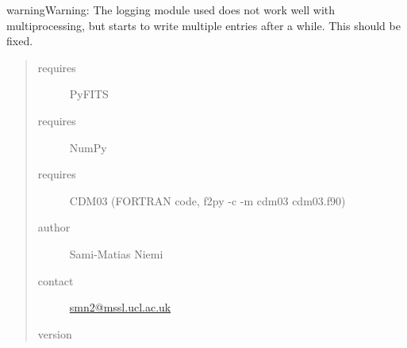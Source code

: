 \documentclass[a4paper,11pt,english]{sphinxmanual}
\begin{document}
\begin{notice}{warning}{Warning:}
The logging module used does not work well with multiprocessing, but
starts to write multiple entries after a while. This should be fixed.
\end{notice}
\begin{quote}\begin{description}
\item[{requires}] \leavevmode
PyFITS

\item[{requires}] \leavevmode
NumPy

\item[{requires}] \leavevmode
CDM03 (FORTRAN code, f2py -c -m cdm03 cdm03.f90)

\item[{author}] \leavevmode
Sami-Matias Niemi

\item[{contact}] \leavevmode
\href{mailto:smn2@mssl.ucl.ac.uk}{smn2@mssl.ucl.ac.uk}

\item[{version}] 

\end{description}\end{quote}
\end{document}
